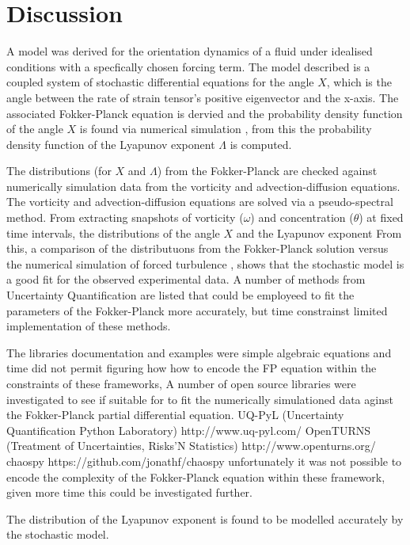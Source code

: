 \chapter{Discussion} \label{ch:discussion}

A model was derived for the orientation dynamics of a fluid under idealised conditions with a specfically chosen forcing term. The model described is a coupled system of stochastic 
differential equations for the angle $X$, which is the angle between the rate of strain tensor's positive eigenvector and the x-axis. The associated Fokker-Planck equation is
dervied and the probability density function of the angle $X$ is found via numerical simulation , from this the probability density function of the Lyapunov exponent $\Lambda$ is computed.

The distributions (for $X$ and $\Lambda$) from the Fokker-Planck are checked against numerically simulation data from the vorticity and advection-diffusion equations. The vorticity and advection-diffusion equations
are solved via a pseudo-spectral method. From extracting snapshots of vorticity ($\omega$) and concentration ($\theta$) at fixed time intervals, the distributions of the angle $X$ and the Lyapunov exponent
From this, a comparison of the distributuons from the Fokker-Planck solution versus the numerical simulation of forced turbulence , shows that the stochastic model is a good fit for the observed experimental data.
A number of methods from Uncertainty Quantification are listed that could be employeed to fit the parameters of the Fokker-Planck more accurately, but time constrainst limited implementation of these methods.

The libraries documentation and examples were simple algebraic equations and time did not permit figuring how  how to encode the FP equation within the constraints of these frameworks, 
A number of open source libraries were investigated to see if suitable for to fit the numerically simulationed data aginst the Fokker-Planck partial differential equation.
UQ-PyL (Uncertainty Quantification Python Laboratory)  http://www.uq-pyl.com/
OpenTURNS  (Treatment of Uncertainties, Risks'N Statistics) http://www.openturns.org/ 
chaospy https://github.com/jonathf/chaospy
unfortunately it was not possible to encode the complexity of the Fokker-Planck equation within these framework, given more time this could be investigated further.

The distribution of the Lyapunov exponent is found to be modelled accurately by the stochastic model. 
